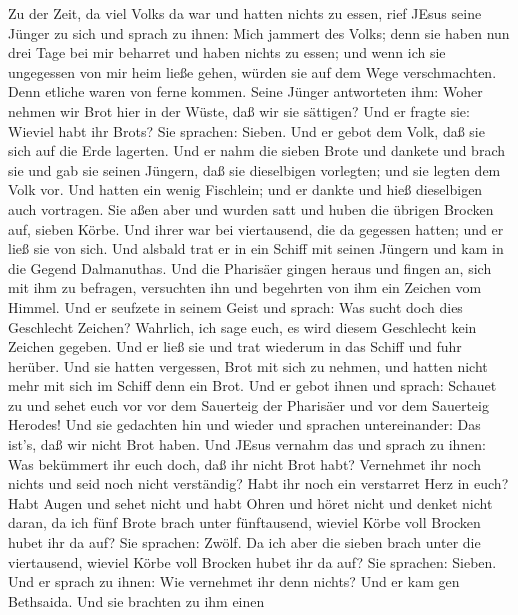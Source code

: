  Zu der Zeit, da viel Volks da war und hatten nichts zu
essen, rief JEsus seine Jünger zu sich und sprach zu ihnen: 
Mich jammert des Volks; denn sie haben nun drei Tage bei mir beharret
und haben nichts zu essen;  und wenn ich sie ungegessen von
mir heim ließe gehen, würden sie auf dem Wege verschmachten. Denn
etliche waren von ferne kommen.  Seine Jünger antworteten
ihm: Woher nehmen wir Brot hier in der Wüste, daß wir sie sättigen?
 Und er fragte sie: Wieviel habt ihr Brots? Sie sprachen:
Sieben.  Und er gebot dem Volk, daß sie sich auf die Erde
lagerten. Und er nahm die sieben Brote und dankete und brach sie und gab
sie seinen Jüngern, daß sie dieselbigen vorlegten; und sie legten dem
Volk vor.  Und hatten ein wenig Fischlein; und er dankte und
hieß dieselbigen auch vortragen.  Sie aßen aber und wurden
satt und huben die übrigen Brocken auf, sieben Körbe.  Und
ihrer war bei viertausend, die da gegessen hatten; und er ließ sie von
sich.  Und alsbald trat er in ein Schiff mit seinen Jüngern
und kam in die Gegend Dalmanuthas.  Und die Pharisäer
gingen heraus und fingen an, sich mit ihm zu befragen, versuchten ihn
und begehrten von ihm ein Zeichen vom Himmel.  Und er
seufzete in seinem Geist und sprach: Was sucht doch dies Geschlecht
Zeichen? Wahrlich, ich sage euch, es wird diesem Geschlecht kein Zeichen
gegeben.  Und er ließ sie und trat wiederum in das Schiff
und fuhr herüber.  Und sie hatten vergessen, Brot mit sich
zu nehmen, und hatten nicht mehr mit sich im Schiff denn ein Brot.
 Und er gebot ihnen und sprach: Schauet zu und sehet euch
vor vor dem Sauerteig der Pharisäer und vor dem Sauerteig Herodes!
 Und sie gedachten hin und wieder und sprachen
untereinander: Das ist's, daß wir nicht Brot haben.  Und
JEsus vernahm das und sprach zu ihnen: Was bekümmert ihr euch doch, daß
ihr nicht Brot habt? Vernehmet ihr noch nichts und seid noch nicht
verständig? Habt ihr noch ein verstarret Herz in euch? 
Habt Augen und sehet nicht und habt Ohren und höret nicht und denket
nicht daran,  da ich fünf Brote brach unter fünftausend,
wieviel Körbe voll Brocken hubet ihr da auf? Sie sprachen: Zwölf.
 Da ich aber die sieben brach unter die viertausend,
wieviel Körbe voll Brocken hubet ihr da auf? Sie sprachen: Sieben.
 Und er sprach zu ihnen: Wie vernehmet ihr denn nichts?
 Und er kam gen Bethsaida. Und sie brachten zu ihm einen
